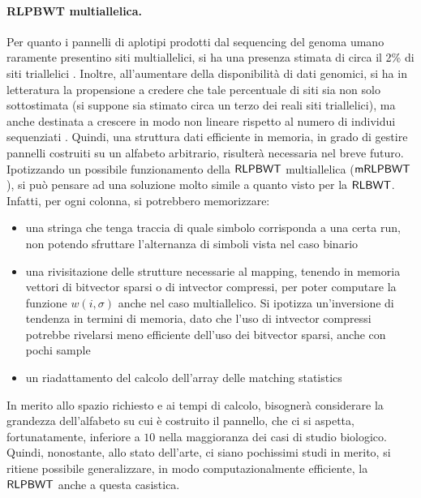 \paragraph{RLPBWT multiallelica.}
Per quanto i pannelli di aplotipi prodotti dal sequencing del genoma umano
raramente presentino siti multiallelici, si ha una presenza stimata
di circa il 2\% di siti triallelici \cite{tri}. Inoltre, all'aumentare della
disponibilità di dati genomici, si ha in letteratura la propensione a credere
che tale percentuale di siti sia non solo sottostimata (si suppone sia
stimato circa un terzo dei reali siti triallelici), ma anche destinata a
crescere in modo non lineare rispetto al numero di individui sequenziati
\cite{tri2}. Quindi, una struttura dati efficiente in memoria, in grado di
gestire pannelli costruiti su un alfabeto arbitrario, risulterà necessaria nel
breve futuro.\\
Ipotizzando un possibile funzionamento della $\mbox{\rm {\sf RLPBWT}}$
multiallelica ($\mbox{\rm {\sf mRLPBWT}}$), si può pensare ad una soluzione molto
simile a quanto visto per la $\mbox{\rm {\sf RLBWT}}$. Infatti, per ogni colonna, si
potrebbero memorizzare:
\begin{itemize}
  \item una stringa che tenga traccia di quale simbolo corrisponda a una certa
  run, 
  non potendo sfruttare l'alternanza di simboli vista nel caso binario
  \item una rivisitazione delle strutture necessarie al mapping, tenendo in
  memoria vettori di bitvector sparsi o di intvector compressi, per poter
  computare la funzione $w(i,\sigma)$ anche nel caso multiallelico. Si ipotizza
  un'inversione di 
  tendenza in termini di memoria, dato che l'uso di intvector
  compressi potrebbe rivelarsi meno efficiente dell'uso dei bitvector sparsi,
  anche con pochi sample
  \item un riadattamento del calcolo dell'array delle matching statistics 
\end{itemize}
In merito allo spazio richiesto e ai tempi di calcolo, bisognerà considerare la
grandezza dell'alfabeto su cui è costruito il pannello, che ci si aspetta,
fortunatamente, 
inferiore a $10$ nella maggioranza dei casi di studio biologico.\\
Quindi, nonostante, allo stato dell'arte, ci siano pochissimi studi in merito,
si ritiene 
possibile generalizzare, in modo computazionalmente efficiente, la
$\mbox{\rm {\sf RLPBWT}}$ anche a questa casistica. 
